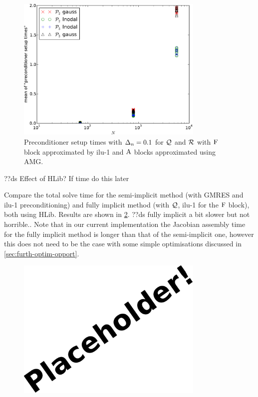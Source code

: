 \begin{figure}
  \centering
  \includegraphics[width=0.8\textwidth]{plots/linear_solvers_p2p3/implicitilu-1-meanofpreconditionersetuptimesvsinitialnnode.pdf}
  \caption{Preconditioner setup times with $\Delta_{n}=0.1$ for $\mathcal{Q}$ and $\mathcal{R}$ with $\mathrm{F}$ block approximated by ilu-1 and $\mathrm{A}$ blocks approximated using AMG.}
  \label{fig:times-p23-ilu1}
\end{figure}

??ds Effect of HLib? If time do this later

Compare the total solve time for the semi-implicit method (with GMRES and ilu-1 preconditioning) and fully implicit method (with $\mathcal{Q}$, ilu-1 for the $\mathrm{F}$ block), both using HLib.
Results are shown in \cref{fig:times-semi-vs-fully-implicit}.
??ds fully implicit a bit slower but not horrible..
Note that in our current implementation the Jacobian assembly time for the fully implicit method is longer than that of the semi-implicit one, however this does not need to be the case with some simple optimisations discussed in \cref{sec:furth-optim-opport}.

\begin{figure}
  \centering
  \includegraphics[width=0.8\textwidth]{images/placeholder}
  \caption{}
  \label{fig:times-semi-vs-fully-implicit}
\end{figure}


